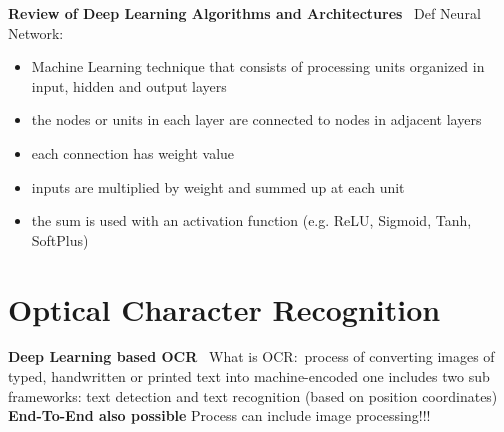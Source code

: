 \textbf{Review of Deep Learning Algorithms and Architectures}~\citep{shrestha_review_2019}
Def Neural Network:
\begin{itemize}
    \item Machine Learning technique that consists of processing units organized in input,
        hidden and output layers
    \item the nodes or units in each layer are connected to nodes in adjacent layers
    \item each connection has weight value
    \item inputs are multiplied by weight and summed up at each unit
    \item the sum is used with an activation function (e.g. ReLU, Sigmoid, Tanh, SoftPlus)
\end{itemize}

\section{Optical Character Recognition}

\textbf{Deep Learning based OCR}~\citep{zhao_improving_2020}
What is OCR:\ process of converting images of typed, handwritten or printed text into machine-encoded one
includes two sub frameworks: text detection and text recognition (based on position coordinates)
\textbf{End-To-End also possible}
Process can include image processing!!!


